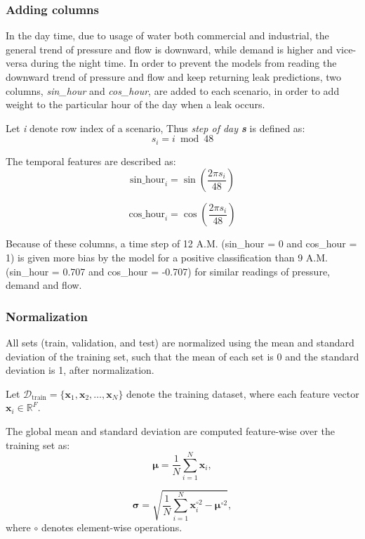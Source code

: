 \documentclass[final,5p,times,twocolumn,authoryear]{elsarticle}
\begin{document}
\subsubsection{Adding columns}

In the day time, due to usage of water both commercial and industrial, the general trend of pressure and flow is downward, while demand is higher and vice-versa during the night time. In order to prevent the models from reading the downward trend of pressure and flow and keep returning leak predictions, two columns, \textit{sin\_hour} and \textit{cos\_hour}, are added to each scenario, in order to add weight to the particular hour of the day when a leak occurs.

Let \textit{i} denote row index of a scenario, Thus \textit{step of day \textbf{s}} is defined as:
\[
s_i = i \bmod 48
\]

The temporal features are described as:
\[
\text{sin\_hour}_i = \sin\!\left( \frac{2\pi s_i}{48} \right)
\]

\[
\text{cos\_hour}_i = \cos\!\left( \frac{2\pi s_i}{48} \right)
\]

Because of these columns, a time step of 12 A.M. (sin\_hour = 0 and cos\_hour = 1) is given more bias by the model for a positive classification than 9 A.M. (sin\_hour = 0.707 and cos\_hour = -0.707) for similar readings of pressure, demand and flow.

\subsubsection{Normalization}

All sets (train, validation, and test) are normalized using the mean and standard deviation of the training set, such that the mean of each set is 0 and the standard deviation is 1, after normalization.

\vspace{0.05cm}

Let $\mathcal{D}_{\text{train}} = \{\mathbf{x}_1, \mathbf{x}_2, \dots, \mathbf{x}_N\}$
denote the training dataset, where each feature vector
$\mathbf{x}_i \in \mathbb{R}^{F}$.

The global mean and standard deviation are computed feature-wise over the
training set as:
\begin{equation}
\boldsymbol{\mu} =
\frac{1}{N} \sum_{i=1}^{N} \mathbf{x}_i,
\end{equation}

\begin{equation}
\boldsymbol{\sigma} =
\sqrt{
\frac{1}{N} \sum_{i=1}^{N} \mathbf{x}_i^{\circ 2}
- \boldsymbol{\mu}^{\circ 2}
},
\end{equation}
where $\circ$ denotes element-wise operations.
\end{document}
